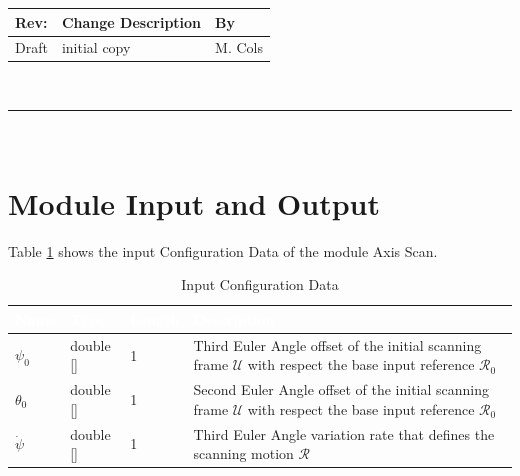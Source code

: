 \documentclass[]{AVSSimReportMemo}
\begin{document}
\makeCover


%
%
\pagestyle{empty}
{\renewcommand{\arraystretch}{2}
\noindent
\begin{longtable}{|p{0.5in}|p{4.5in}|p{1.14in}|}
\hline
{\bfseries Rev}: & {\bfseries Change Description} & {\bfseries By} \\
\hline
Draft & initial copy & M. Cols \\
\hline

\end{longtable}
}

\newpage
\setcounter{page}{1}
\pagestyle{fancy}

\tableofcontents
~\\ \hrule ~\\

\section{Module Input and Output}
Table \ref{tab:inputConfigTable} shows the input Configuration Data of the module Axis Scan.
\begin{table}[h!]
	\centering
	\caption{Input Configuration Data}
	\begin{tabular}{|l|l|l|p{3in}|}
		\hline
		\rowcolor{BrickRed}
		\textcolor{white}{Name} & \textcolor{white}{Type} & 
		\textcolor{white}{Length} & 
		\textcolor{white}{Description}  \\ \hline
		$\psi_0$ & double [] & 1 & 
		Third Euler Angle offset of the initial scanning frame $\mathcal{U}$ with respect the base input reference $\mathcal{R}_0$\\ \hline
		$\theta_0$& double [] & 1 & 
		Second Euler Angle offset of the initial scanning frame $\mathcal{U}$ with respect the base input reference $\mathcal{R}_0$\\ \hline
		$\dot{\psi}$ & double [] & 1 & 
		Third Euler Angle variation rate that defines the scanning motion  $\mathcal{R}$\\ \hline
	\end{tabular}
	\label{tab:inputConfigTable}
\end{table}
\end{document}
